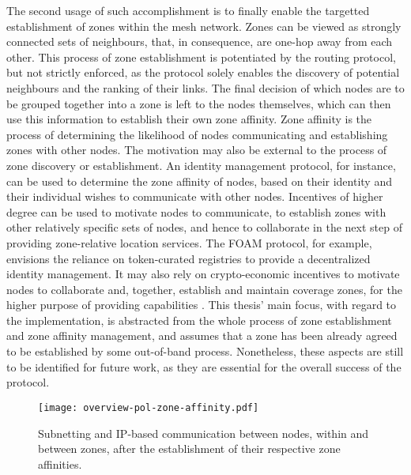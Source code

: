 The second usage of such accomplishment is to finally enable the targetted establishment of zones within the mesh network. Zones can be viewed as strongly connected sets of neighbours, that, in consequence, are one-hop away from each other. This process of zone establishment is potentiated by the routing protocol, but not strictly enforced, as the protocol solely enables the discovery of potential neighbours and the ranking of their links. The final decision of which nodes are to be grouped together into a zone is left to the nodes themselves, which can then use this information to establish their own zone affinity. Zone affinity is the process of determining the likelihood of nodes communicating and establishing zones with other nodes. The motivation may also be external to the process of zone discovery or establishment. An identity management protocol, for instance, can be used to determine the zone affinity of nodes, based on their identity and their individual wishes to communicate with other nodes. Incentives of higher degree can be used to motivate nodes to communicate, to establish zones with other relatively specific sets of nodes, and hence to collaborate in the next step of providing zone-relative location services. The FOAM protocol, for example, envisions the reliance on token-curated registries to provide a decentralized identity management. It may also rely on crypto-economic incentives to motivate nodes to collaborate and, together, establish and maintain coverage zones, for the higher purpose of providing \pol{} capabilities \cite{foam-white-paper}. This thesis' main focus, with regard to the \poc{} implementation, is abstracted from the whole process of zone establishment and zone affinity management, and assumes that a zone has been already agreed to be established by some out-of-band process. Nonetheless, these aspects are still to be identified for future work, as they are essential for the overall success of the protocol.

\begin{figure}[h!]
    \begin{center}
    \texttt{[image: overview-pol-zone-affinity.pdf]}
    \caption{Subnetting and IP-based communication between nodes, within and between zones, after the establishment of their respective zone affinities.}
    \label{fig:proof-of-location-overview-pol-zone-affinity}
    \end{center}
\end{figure}

